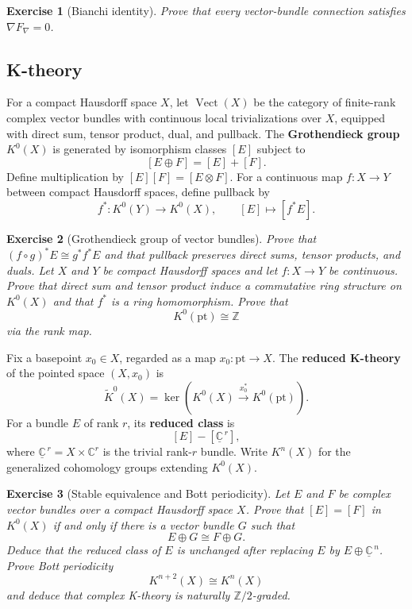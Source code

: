 \documentclass{article}
\newtheorem{exercise}{Exercise}
\begin{document}
\begin{exercise}[Bianchi identity]\leavevmode\par
\textit{Prove that every vector-bundle connection satisfies
$\nabla F_\nabla=0$.}
\end{exercise}

\subsection{K-theory}

For a compact Hausdorff space $X$, let $\operatorname{Vect}(X)$ be the category of finite-rank complex vector bundles with continuous local trivializations over $X$, equipped with direct sum, tensor product, dual, and pullback. The \textbf{Grothendieck group} $K^0(X)$ is generated by isomorphism classes $[E]$ subject to
\[
[E\oplus F]=[E]+[F].
\]
Define multiplication by $[E][F]=[E\otimes F]$. For a continuous map $f:X\to Y$ between compact Hausdorff spaces, define pullback by
\[
f^*:K^0(Y)\longrightarrow K^0(X),
\qquad
[E]\longmapsto[f^*E].
\]

\begin{exercise}[Grothendieck group of vector bundles]\leavevmode\par
\textit{Prove that $(f\circ g)^*E\cong g^*f^*E$ and that pullback preserves direct sums, tensor products, and duals. Let $X$ and $Y$ be compact Hausdorff spaces and let $f:X\to Y$ be continuous. Prove that direct sum and tensor product induce a commutative ring structure on $K^0(X)$ and that $f^*$ is a ring homomorphism. Prove that}
\[
K^0(\mathrm{pt})\cong\mathbb Z
\]
\textit{via the rank map.}
\end{exercise}

Fix a basepoint $x_0\in X$, regarded as a map $x_0:\mathrm{pt}\to X$. The \textbf{reduced K-theory} of the pointed space $(X,x_0)$ is
\[
\widetilde K^0(X)
=\ker\!\left(K^0(X)\xrightarrow{x_0^*}K^0(\mathrm{pt})\right).
\]
For a bundle $E$ of rank $r$, its \textbf{reduced class} is
\[
[E]-[\underline{\mathbb C}^{\,r}],
\]
where $\underline{\mathbb C}^{\,r}=X\times\mathbb C^r$ is the trivial rank-$r$ bundle. Write $K^n(X)$ for the generalized cohomology groups extending $K^0(X)$.

\begin{exercise}[Stable equivalence and Bott periodicity]\leavevmode\par
\textit{Let $E$ and $F$ be complex vector bundles over a compact Hausdorff space $X$. Prove that $[E]=[F]$ in $K^0(X)$ if and only if there is a vector bundle $G$ such that}
\[
E\oplus G\cong F\oplus G.
\]
\textit{Deduce that the reduced class of $E$ is unchanged after replacing $E$ by $E\oplus\underline{\mathbb C}^{\,n}$. Prove Bott periodicity}
\[
K^{n+2}(X)\cong K^n(X)
\]
\textit{and deduce that complex K-theory is naturally $\mathbb Z/2$-graded.}
\end{exercise}
\end{document}

